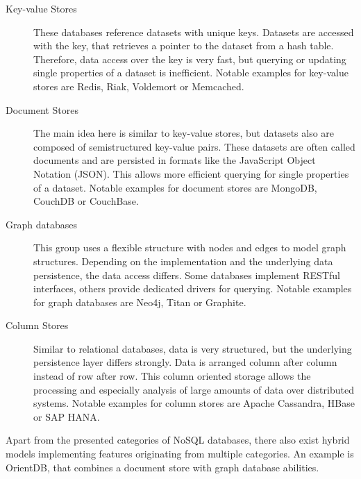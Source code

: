 \begin{description}
\item [Key-value Stores] These databases reference datasets with unique keys. Datasets are accessed with the key, that retrieves a pointer to the dataset from a hash table. Therefore, data access over the key is very fast, but querying or updating single properties of a dataset is inefficient. Notable examples for key-value stores are Redis, Riak, Voldemort or Memcached.
\item [Document Stores] The main idea here is similar to key-value stores, but datasets also are composed of semistructured key-value pairs. These datasets are often called documents and are persisted in formats like the JavaScript Object Notation (JSON). This allows more efficient querying for single properties of a dataset. Notable examples for document stores are MongoDB, CouchDB or CouchBase.
\item [Graph databases] This group uses a flexible structure with nodes and edges to model graph structures. Depending on the implementation and the underlying data persistence, the data access differs. Some databases implement RESTful interfaces, others provide dedicated drivers for querying. Notable examples for graph databases are Neo4j, Titan or Graphite.
\item [Column Stores] Similar to relational databases, data is very structured, but the underlying persistence layer differs strongly. Data is arranged column after column instead of row after row. This column oriented storage allows the processing and especially analysis of large amounts of data over distributed systems. Notable examples for column stores are Apache Cassandra, HBase or SAP HANA.
\end{description}

Apart from the presented categories of NoSQL databases, there also exist hybrid models implementing features originating from multiple categories. An example is OrientDB, that combines a document store with graph database abilities. 

